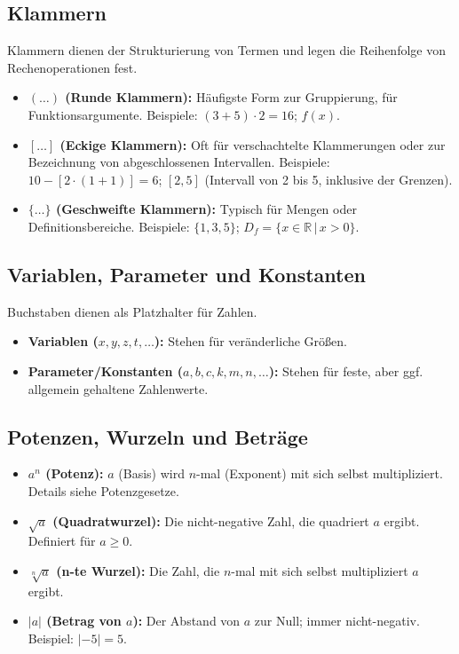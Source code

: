 \subsection{Klammern}
Klammern dienen der Strukturierung von Termen und legen die Reihenfolge von Rechenoperationen fest.
\begin{itemize}
    \item \textbf{$(\dots)$ (Runde Klammern):} Häufigste Form zur Gruppierung, für Funktionsargumente. Beispiele: $(3+5) \cdot 2 = 16$; $f(x)$.
    \item \textbf{$[\dots]$ (Eckige Klammern):} Oft für verschachtelte Klammerungen oder zur Bezeichnung von abgeschlossenen Intervallen. Beispiele: $10 - [2 \cdot (1+1)] = 6$; $[2, 5]$ (Intervall von 2 bis 5, inklusive der Grenzen).
    \item \textbf{$\{\dots\}$ (Geschweifte Klammern):} Typisch für Mengen oder Definitionsbereiche. Beispiele: $\{1, 3, 5\}$; $D_f = \{x \in \mathbb{R} \,|\, x > 0\}$.
\end{itemize}

\subsection{Variablen, Parameter und Konstanten}
Buchstaben dienen als Platzhalter für Zahlen.
\begin{itemize}
    \item \textbf{Variablen ($x, y, z, t, \dots$):} Stehen für veränderliche Größen.
    \item \textbf{Parameter/Konstanten ($a, b, c, k, m, n, \dots$):} Stehen für feste, aber ggf. allgemein gehaltene Zahlenwerte.
\end{itemize}

\subsection{Potenzen, Wurzeln und Beträge}
\begin{itemize}
    \item \textbf{$a^n$ (Potenz):} $a$ (Basis) wird $n$-mal (Exponent) mit sich selbst multipliziert. Details siehe Potenzgesetze.
    \item \textbf{$\sqrt{a}$ (Quadratwurzel):} Die nicht-negative Zahl, die quadriert $a$ ergibt. Definiert für $a \ge 0$.
    \item \textbf{$\sqrt[n]{a}$ (n-te Wurzel):} Die Zahl, die $n$-mal mit sich selbst multipliziert $a$ ergibt.
    \item \textbf{$|a|$ (Betrag von $a$):} Der Abstand von $a$ zur Null; immer nicht-negativ. Beispiel: $|-5|=5$.
\end{itemize}


